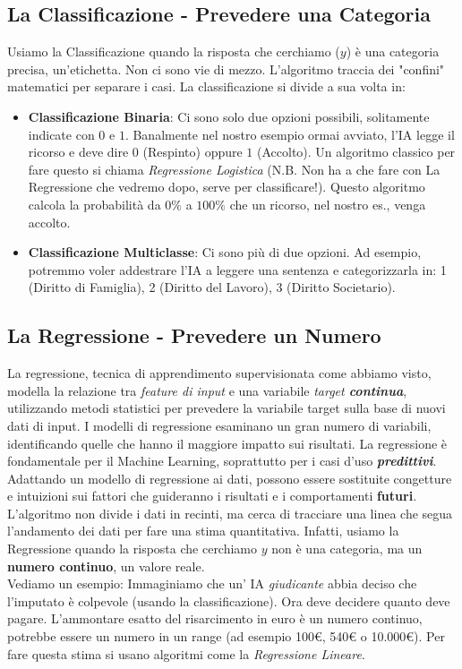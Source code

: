\documentclass{article}
\begin{document}
\subsection{La Classificazione - Prevedere una Categoria}
Usiamo la Classificazione quando la risposta che cerchiamo ($y$) è una categoria precisa, un'etichetta. Non ci sono vie di mezzo. L'algoritmo traccia dei "confini" matematici per separare i casi.
La classificazione si divide a sua volta in:
\begin{itemize}
\item \textbf{Classificazione Binaria}: Ci sono solo due opzioni possibili, solitamente indicate con $0$ e $1$. Banalmente nel nostro esempio ormai avviato, l'IA legge il ricorso e deve dire $0$ (Respinto) oppure $1$ (Accolto). Un algoritmo classico per fare questo si chiama \textit{Regressione Logistica} (N.B. Non ha a che fare con La Regressione che vedremo dopo, serve per classificare!). Questo algoritmo calcola la probabilità da $0\%$ a $100\%$ che un ricorso, nel nostro es., venga accolto.

\item \textbf{Classificazione Multiclasse}: Ci sono più di due opzioni. Ad esempio, potremmo voler addestrare l'IA a leggere una sentenza e categorizzarla in: 1 (Diritto di Famiglia), 2 (Diritto del Lavoro), 3 (Diritto Societario).

\end{itemize}

\subsection{La Regressione - Prevedere un Numero}
La regressione, tecnica di apprendimento supervisionata come abbiamo visto, modella la relazione tra \textit{feature di input} e una variabile \textit{target \textbf{continua}}, utilizzando metodi statistici per prevedere la variabile target sulla base di nuovi dati di input. I modelli di regressione esaminano un gran numero di variabili, identificando quelle che hanno il maggiore impatto sui risultati. La regressione è fondamentale per il Machine Learning, soprattutto per i casi d'uso \textbf{\textit{predittivi}}. Adattando un modello di regressione ai dati, possono essere sostituite congetture e intuizioni sui fattori che guideranno i risultati e i comportamenti \textbf{futuri}.
L'algoritmo non divide i dati in recinti, ma cerca di tracciare una linea che segua l'andamento dei dati per fare una stima quantitativa.
Infatti, usiamo la Regressione quando la risposta che cerchiamo $y$ non è una categoria, ma un \textbf{numero continuo}, un valore reale.\\
Vediamo un esempio: Immaginiamo che un' IA \textit{giudicante} abbia deciso che l'imputato è colpevole (usando la classificazione). Ora deve decidere quanto deve pagare. L'ammontare esatto del risarcimento in euro è un numero continuo, potrebbe essere un numero in un range (ad esempio 100€, 540€ o 10.000€). Per fare questa stima si usano algoritmi come la \textit{Regressione Lineare}.
\end{document}
